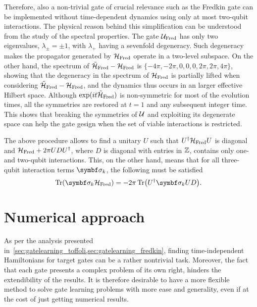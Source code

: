 Therefore, also a non-trivial gate of crucial relevance such as the Fredkin gate can be implemented without time-dependent dynamics using only at most two-qubit interactions.
The physical reason behind this simplification can be understood from the study of the spectral properties.
The gate ${\mathcal{U}}_{\operatorname{Fred}}$ has only two eigenvalues, $\lambda_\pm=\pm1$,
with $\lambda_+$ having a sevenfold degeneracy. Such degeneracy makes the propagator generated by ${\mathcal{H}}_{\operatorname{Fred}}$ operate in a two-level subspace.
On the other hand, the spectrum of $\tilde{{\mathcal{H}}}_{\operatorname{Fred}}-{\mathcal{H}}_{\operatorname{Fred}}$ is $\{{-}4\pi,{-}2\pi,0,0,0,2\pi,2\pi,4\pi\}$, showing that the degeneracy in the spectrum of ${\mathcal{H}}_{\operatorname{Fred}}$ is partially lifted when considering 
$\tilde{{\mathcal{H}}}_{\operatorname{Fred}}-{\mathcal{H}}_{\operatorname{Fred}}$, and the dynamics thus occurs in an  larger effective Hilbert space.  %
Although $\exponential(it\HTildeFred)$ is non-symmetric for most of the evolution times, all the symmetries are restored at $t=1$ and any subsequent integer time. This  shows that breaking the symmetries of ${\mathcal{U}}$ and exploiting its degenerate space can help the gate gesign when the set of viable interactions is restricted.

The above procedure allows to find a unitary $U$ such that
$U^\dagger{\mathcal{H}}_{\operatorname{Fred}} U$ is diagonal and
${\mathcal{H}}_{\operatorname{Fred}} + 2\pi U D U^\dagger$, where $D$ is diagonal with entries in $\mathbb{Z}$, contains only one- and two-qubit interactions.
This, on the other hand, means that for all three-qubit interaction terms $\bs\sigma_k$, the following must be satisfied
\begin{equation}
    \Tr(\bs\sigma_k\HFred) = -2\pi \Tr(U^\dagger\bs\sigma_k U D).
\end{equation}



\section{Numerical approach}
\label{sec:numerical_approach}

As per the analysis presented in~\cref{sec:gatelearning_toffoli,sec:gatelearning_fredkin}, finding time-independent Hamiltonians for target gates can be a rather nontrivial task. 
Moreover, the fact that each gate presents a complex problem of its own right, hinders the extendibility of the results.
It is therefore desirable to have a more flexible method to solve gate learning problems with more ease and generality, even if at the cost of just getting numerical results.

